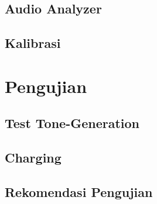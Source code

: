 \documentclass[12pt]{book}
\begin{document}
    \section{Audio Analyzer}

    \section{Kalibrasi}

    \chapter{Pengujian}

    \section{Test Tone-Generation}

    \section{Charging}

    \section{Rekomendasi Pengujian}
\end{document}
